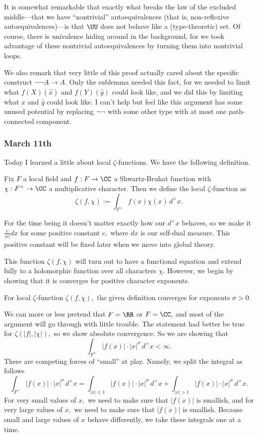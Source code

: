 It is somewhat remarkable that exactly what breaks the law of the excluded middle---that we have ``nontrivial'' autoequivalences (that is, non-reflexive autoequivalences)---is that $\UU$ does not behave like a (type-theoretic) set. Of course, there is univalence hiding around in the background, for we took advantage of these nontrivial autoequivalences by turning them into nontrivial loops.

We also remark that very little of this proof actually cared about the specific construct $\lnot\lnot A\to A.$ Only the sublemma needed this fact, for we needed to limit what $f(X)(\hat x)$ and $f(Y)(\hat y)$ could look like, and we did this by limiting what $\hat x$ and $\hat y$ could look like. I can't help but feel like this argument has some unused potential by replacing $\lnot\lnot$ with some other type with at most one path-connected component.

\subsubsection{March 11th}
Today I learned a little about local $\zeta$-functions. We have the following definition.
\begin{definition}
    Fix $F$ a local field and $f:F\to\CC$ a Shwartz-Bruhat function with $\chi:F^\times\to\CC$ a multiplicative character. Then we define the local $\zeta$-function as
    \[\zeta(f,\chi):=\int_{F^\times}f(x)\chi(x)\,d^\times x.\]
\end{definition}
For the time being it doesn't matter exactly how our $d^\times x$ behaves, so we make it $\frac c{|x|}dx$ for some positive constant $c,$ where $dx$ is our self-dual measure. This positive constant will be fixed later when we move into global theory.

This function $\zeta(f,\chi)$ will turn out to have a functional equation and extend fully to a holomorphic function over all characters $\chi.$ However, we begin by showing that it is converges for positive character exponents.
\begin{lemma}
    For local $\zeta$-function $\zeta(f,\chi),$ the given definition converges for exponents $\sigma>0.$
\end{lemma}
We can more or less pretend that $F=\RR$ or $F=\CC,$ and most of the argument will go through with little trouble. The statement had better be true for $\zeta(|f|,|\chi|),$ so we show absolute convergence. So we are showing that
\[\int_{F^\times}|f(x)|\cdot|x|^\sigma\,d^\times x<\infty.\]
There are competing forces of ``small'' at play. Namely, we split the integral as follows
\[\int_{F^\times}|f(x)|\cdot|x|^\sigma\,d^\times x=\int_{|x|\le1}|f(x)|\cdot|x|^\sigma\,d^\times x+\int_{|x|>1}|f(x)|\cdot|x|^\sigma\,d^\times x.\]
For very small values of $x,$ we need to make sure that $|f(x)|$ is smallish, and for very large values of $x,$ we need to make sure that $|f(x)|$ is smallish. Because small and large values of $x$ behave differently, we take these integrals one at a time.

